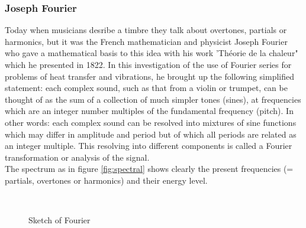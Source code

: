 \subsubsection{Joseph Fourier}
Today when musicians desribe a timbre they talk about overtones, partials or harmonics, but it was the French mathematician and physicist Joseph Fourier who gave a mathematical basis to this idea with his work 'Th\'{e}orie de la chaleur" which he presented in 1822. In this investigation of the use of Fourier series for problems of heat transfer and vibrations, he brought up the following simplified statement: each complex sound, such as that from a violin or trumpet, can be thought of as the sum of a collection of much simpler tones (sines),  at frequencies which are an integer number multiples of the fundamental frequency (pitch). In other words: each complex sound can be resolved into mixtures of sine functions which may differ in amplitude and period but of which all periods are related as an integer multiple. This resolving into different components is called a Fourier transformation or analysis of the signal. \\ The spectrum as in figure \ref{fig:spectral} shows clearly the present frequencies (= partials, overtones or harmonics) and their energy level.
\begin{figure}[htbp]
   \centerline{\hbox{
   \epsfxsize=1.2in
     }
  }
  \caption{Sketch of Fourier}
  \label{fig:fourier}
\end{figure}

